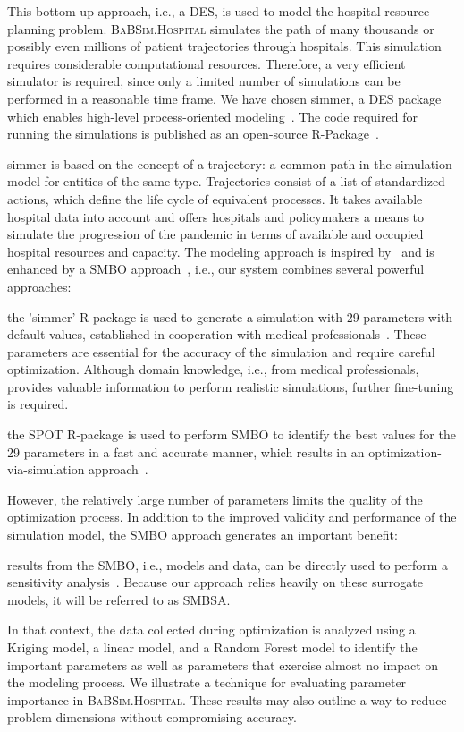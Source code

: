 \documentclass[conference]{IEEEtran}
\newcommand{\babsimhospital}{\textsc{BaBSim.Hospital}\xspace}
\renewenvironment{description}[0]{\begin{compactdesc}}{\end{compactdesc}}
\begin{document}
This bottom-up approach, i.e., a \gls{DES}, is used to model the hospital resource planning problem.
\babsimhospital simulates the path of many thousands or possibly even millions of patient trajectories through hospitals.
This simulation requires considerable computational resources.
Therefore, a very efficient simulator is required, since only a limited number of simulations can be performed in a reasonable time frame.
We have chosen \gls{simmer}, a \gls{DES} package which enables high-level process-oriented modeling~\citep{Ucar19a}. 
The code required for running the simulations is published as an open-source R-Package~\citep{Anon21b}.

\gls{simmer} is based on the concept of a trajectory: a common path in the simulation model for entities of the same type.
Trajectories consist of a list of standardized actions, which define the life cycle of equivalent processes. 
It takes available hospital data into account and offers hospitals and policymakers a means to simulate the progression of the pandemic in terms of available and occupied hospital resources and capacity. 
The modeling approach is inspired by~\citet{Lawt19a} and is enhanced by a  \gls{SMBO} approach~\citep{Forr08a}, i.e., our system 
combines several powerful approaches: 
\begin{description}
    \item[Discrete event simulation:] the 'simmer' R-package is used to generate a simulation with 29 parameters with default values, established in cooperation with medical professionals~\citep{Ucar19a}. These parameters are essential for the accuracy of the simulation and require careful optimization. Although domain knowledge, i.e., from medical professionals, provides valuable information to perform realistic simulations, further fine-tuning is required.
    \item [Model-based optimization:] the  \gls{SPOT} R-package is used to perform  \gls{SMBO} to identify the best values for the 29 parameters in a fast and accurate manner, which results in an optimization-via-simulation approach~\cite{Fu94a}.
\end{description}
However, the relatively large number of parameters limits the quality of the optimization process. 
In addition to the improved validity and performance of the simulation model, the \gls{SMBO} approach generates an important benefit: 
\begin{description}
\item[Sensitivity analysis:] results from the  \gls{SMBO}, i.e., models and data, can be directly used to perform a sensitivity analysis~\citep{Salt08b}.
Because our approach relies heavily on these surrogate models, it will be referred to as \gls{SMBSA}.
\end{description}
In that context, the data collected during optimization is analyzed using a Kriging model, a linear model, and a Random Forest model to identify the important parameters as well as parameters that exercise almost no impact on the modeling process. 
We illustrate a technique for evaluating parameter importance in \babsimhospital.
These results may also outline a way to reduce problem dimensions without compromising accuracy.
\end{document}
